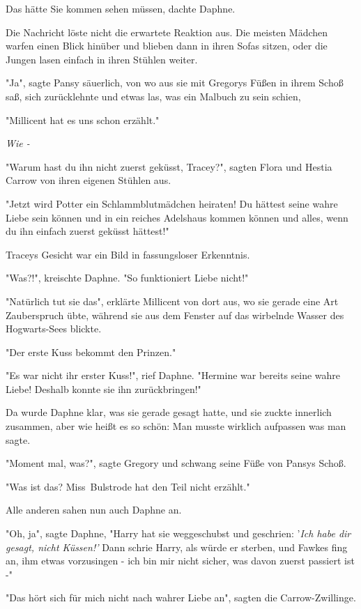 {Das hätte Sie kommen sehen müssen, dachte Daphne.

Die Nachricht löste nicht die erwartete Reaktion aus. Die meisten Mädchen warfen einen Blick hinüber und blieben dann in ihren Sofas sitzen, oder die Jungen lasen einfach in ihren Stühlen weiter.

"Ja", sagte Pansy säuerlich, von wo aus sie mit Gregorys Füßen in ihrem Schoß saß, sich zurücklehnte und etwas las, was ein Malbuch zu sein schien,

"Millicent hat es uns schon erzählt."

\emph{Wie -}

"Warum hast du ihn nicht zuerst geküsst, Tracey?", sagten Flora und Hestia Carrow von ihren eigenen Stühlen aus.

"Jetzt wird Potter ein Schlammblutmädchen heiraten! Du hättest seine wahre Liebe sein können und in ein reiches Adelshaus kommen können und alles, wenn du ihn einfach zuerst geküsst hättest!"

Traceys Gesicht war ein Bild in fassungsloser Erkenntnis.

"Was?!", kreischte Daphne. "So funktioniert Liebe nicht!"

"Natürlich tut sie das", erklärte Millicent von dort aus, wo sie gerade eine Art Zauberspruch übte, während sie aus dem Fenster auf das wirbelnde Wasser des Hogwarts-Sees blickte.

"Der erste Kuss bekommt den Prinzen."

"Es war nicht ihr erster Kuss!", rief Daphne. "Hermine war bereits seine wahre Liebe! Deshalb konnte sie ihn zurückbringen!"

Da wurde Daphne klar, was sie gerade gesagt hatte, und sie zuckte innerlich zusammen, aber wie heißt es so schön: Man musste wirklich aufpassen was man sagte.

"Moment mal, was?", sagte Gregory und schwang seine Füße von Pansys Schoß.

"Was ist das? Miss~Bulstrode hat den Teil nicht erzählt."

Alle anderen sahen nun auch Daphne an.

"Oh, ja", sagte Daphne, "Harry hat sie weggeschubst und geschrien: '\emph{Ich habe dir gesagt, nicht Küssen!'} Dann schrie Harry, als würde er sterben, und Fawkes fing an, ihm etwas vorzusingen - ich bin mir nicht sicher, was davon zuerst passiert ist -"

"Das hört sich für mich nicht nach wahrer Liebe an", sagten die Carrow-Zwillinge.

}
